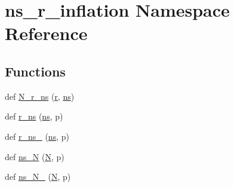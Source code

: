 \hypertarget{namespacens__r__inflation}{}\section{ns\+\_\+r\+\_\+inflation Namespace Reference}
\label{namespacens__r__inflation}
\subsection*{Functions}
\begin{DoxyCompactItemize}
\item 
def \mbox{\hyperlink{namespacens__r__inflation_aaf7dedd695c74c55a95019501ac075e4}{N\+\_\+r\+\_\+ns}} (\mbox{\hyperlink{namespacens__r__inflation_ad1b468856a20486c34d014b6c6743720}{r}}, \mbox{\hyperlink{namespacens__r__inflation_a7678462aaa313287ce9db936063e379e}{ns}})
\item 
def \mbox{\hyperlink{namespacens__r__inflation_a0c0ba75b84f7afac7d804ce185954102}{r\+\_\+ns}} (\mbox{\hyperlink{namespacens__r__inflation_a7678462aaa313287ce9db936063e379e}{ns}}, p)
\item 
def \mbox{\hyperlink{namespacens__r__inflation_a238cf6e6261b24156d8dde9da6e2abfb}{r\+\_\+ns\+\_}} (\mbox{\hyperlink{namespacens__r__inflation_a7678462aaa313287ce9db936063e379e}{ns}}, p)
\item 
def \mbox{\hyperlink{namespacens__r__inflation_aff4b3e2020b6174fc37c75446f5b02d6}{ns\+\_\+N}} (\mbox{\hyperlink{namespacens__r__inflation_af8ba77a6c548bd97ef781a5b3e160b84}{N}}, p)
\item 
def \mbox{\hyperlink{namespacens__r__inflation_aa9c7cca0a43b3ed5aac9df874caa2fe3}{ns\+\_\+\+N\+\_}} (\mbox{\hyperlink{namespacens__r__inflation_af8ba77a6c548bd97ef781a5b3e160b84}{N}}, p)
\end{DoxyCompactItemize}
